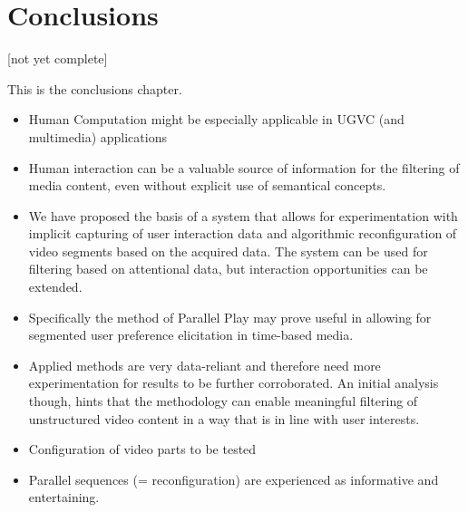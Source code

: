 \chapter{Conclusions}
\label{chapter:conclusions}
[not yet complete]

This is the conclusions chapter.

\begin{itemize}
  \item Human Computation might be especially applicable in UGVC (and multimedia) applications
  \item Human interaction can be a valuable source of information for the filtering of media content, even without explicit use of semantical concepts.
  \item We have proposed the basis of a system that allows for experimentation with implicit capturing of user interaction data and algorithmic reconfiguration of video segments based on the acquired data. The system can be used for filtering based on attentional data, but interaction opportunities can be extended.
  \item Specifically the method of Parallel Play may prove useful in allowing for segmented user preference elicitation in time-based media.
  \item Applied methods are very data-reliant and therefore need more experimentation for results to be further corroborated. An initial analysis though, hints that the methodology can enable meaningful filtering of unstructured video content in a way that is in line with user interests.
  \item Configuration of video parts to be tested
  \item Parallel sequences (= reconfiguration) are experienced as informative and entertaining.
\end{itemize}


